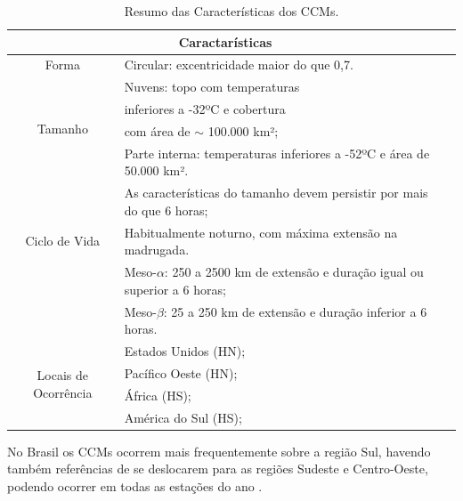 \begin{table}
\caption{Resumo das Características dos CCMs.}
\label{tab01}
\centering
\begin{tabular}{c|p{12cm}l}
\hline
\multicolumn{2}{c}{Caractarísticas}                                                 \\
\hline
Forma                                       & Circular: excentricidade maior do que 0,7.\\
\hline
\multirow{4}{2cm}{Tamanho}                  & Nuvens: topo com temperaturas \\
                                            & inferiores a -32ºC e cobertura \\
                                            & com área de $\sim$ 100.000 km²; \\
                                            & Parte interna: temperaturas inferiores a -52ºC e área de 50.000 km².         \\
\hline
\multirow{3}{2cm}{Ciclo de Vida}            & As características do tamanho devem persistir por mais do que 6 horas;   \\
                                            & Habitualmente noturno, com máxima extensão na madrugada.                \\
\hline
\multirow{3}{2cm}{Escala}                   & Meso-$\alpha$: 250 a 2500 km de extensão e duração igual ou superior a 6 horas;      \\
                                            & Meso-$\beta$: 25 a 250 km de extensão e duração inferior a 6 horas. \\
\hline
\multirow{4}{2cm}{Locais de Ocorrência} & Estados Unidos (HN);                  \\
                                            & Pacífico Oeste (HN);              \\
                                            & África (HS);                      \\
                                            & América do Sul (HS);              \\
\hline
\end{tabular}
\end{table}

No Brasil os CCMs ocorrem mais frequentemente sobre a região Sul, havendo também referências de se deslocarem para as regiões Sudeste e Centro-Oeste, podendo ocorrer em todas as estações do ano \cite{silvadias96}.

